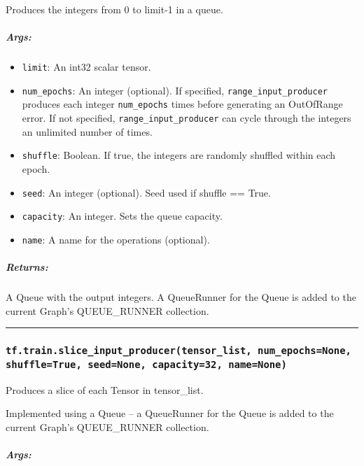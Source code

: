 Produces the integers from 0 to limit-1 in a queue.

\subparagraph{Args: }\label{args-60}

\begin{itemize}
\tightlist
\item
  \texttt{limit}: An int32 scalar tensor.
\item
  \texttt{num\_epochs}: An integer (optional). If specified,
  \texttt{range\_input\_producer} produces each integer
  \texttt{num\_epochs} times before generating an OutOfRange error. If
  not specified, \texttt{range\_input\_producer} can cycle through the
  integers an unlimited number of times.
\item
  \texttt{shuffle}: Boolean. If true, the integers are randomly shuffled
  within each epoch.
\item
  \texttt{seed}: An integer (optional). Seed used if shuffle == True.
\item
  \texttt{capacity}: An integer. Sets the queue capacity.
\item
  \texttt{name}: A name for the operations (optional).
\end{itemize}

\subparagraph{Returns: }\label{returns-51}

A Queue with the output integers. A QueueRunner for the Queue is added
to the current Graph's QUEUE\_RUNNER collection.

\begin{center}\rule{0.5\linewidth}{\linethickness}\end{center}

\subsubsection{\texorpdfstring{\texttt{tf.train.slice\_input\_producer(tensor\_list,\ num\_epochs=None,\ shuffle=True,\ seed=None,\ capacity=32,\ name=None)}
}{tf.train.slice\_input\_producer(tensor\_list, num\_epochs=None, shuffle=True, seed=None, capacity=32, name=None) }}\label{tf.train.sliceux5finputux5fproducertensorux5flist-numux5fepochsnone-shuffletrue-seednone-capacity32-namenone}

Produces a slice of each Tensor in tensor\_list.

Implemented using a Queue -- a QueueRunner for the Queue is added to the
current Graph's QUEUE\_RUNNER collection.

\subparagraph{Args: }\label{args-61}

